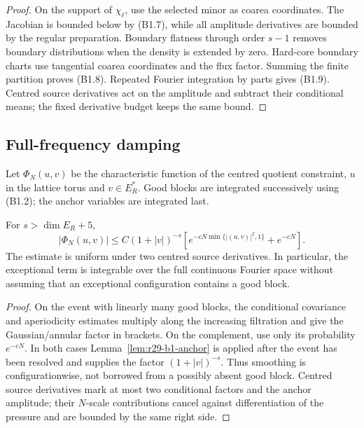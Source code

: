 \begin{proof}
On the support of $\chi_\ell$, use the selected minor as coarea coordinates.
The Jacobian is bounded below by (B1.7), while all amplitude derivatives are
bounded by the regular preparation.  Boundary flatness through order $s-1$
removes boundary distributions when the density is extended by zero.
Hard-core boundary charts use tangential coarea coordinates and the flux
factor.  Summing the finite partition proves (B1.8).  Repeated Fourier
integration by parts gives (B1.9).  Centred source derivatives act on the
amplitude and subtract their conditional means; the fixed derivative budget
keeps the same bound.
\end{proof}

\subsection{Full-frequency damping}

Let $\Phi_N(u,v)$ be the characteristic function of the centred quotient
constraint, $u$ in the lattice torus and $v\in E_R^*$.  Good blocks are
integrated successively using (B1.2); the anchor variables are integrated last.

\begin{theorem}
\label{thm:r29-b1-damping}
For $s>\dim E_R+5$,
\[
 |\Phi_N(u,v)|
 \le C(1+|v|)^{-s}
 \left[e^{-cN\min\{|(u,v)|^2,1\}}+e^{-cN}\right].         \tag{B1.10}
\]
The estimate is uniform under two centred source derivatives.  In particular,
the exceptional term is integrable over the full continuous Fourier space
without assuming that an exceptional configuration contains a good block.
\end{theorem}

\begin{proof}
On the event with linearly many good blocks, the conditional covariance and
aperiodicity estimates multiply along the increasing filtration and give the
Gaussian/annular factor in brackets.  On the complement, use only its
probability $e^{-cN}$.  In both cases Lemma~\ref{lem:r29-b1-anchor} is applied
after the event has been resolved and supplies the factor
$(1+|v|)^{-s}$.  Thus smoothing is configurationwise, not borrowed from a
possibly absent good block.  Centred source derivatives mark at most two
conditional factors and the anchor amplitude; their $N$-scale contributions
cancel against differentiation of the pressure and are bounded by the same
right side.
\end{proof}

